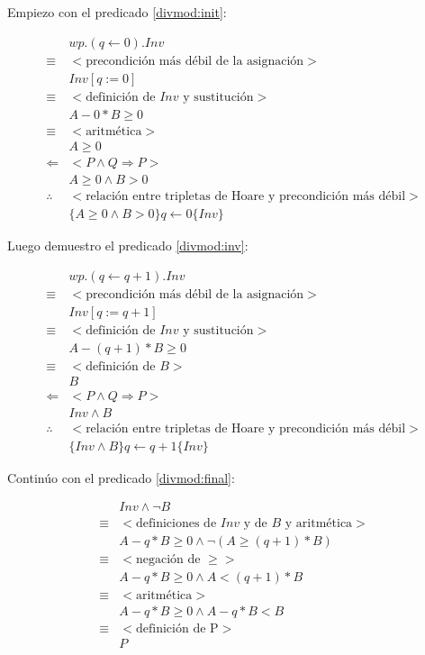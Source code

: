 \documentclass{article}
\begin{document}
Empiezo con el predicado \ref{divmod:init}:

\begin{align*}
 & wp.(q \leftarrow 0).Inv \\
 \equiv & <\text{precondición más débil de la asignación}> \\
 & Inv[q := 0] \\
 \equiv & <\text{definición de } Inv \text{ y sustitución}> \\
 & A - 0*B \geq 0 \\
 \equiv & <\text{aritmética}> \\
 & A \geq 0 \\
 \Leftarrow & <P \wedge Q \Rightarrow P> \\
 & A \geq 0 \wedge B > 0 \\
 \therefore & <\text{relación entre tripletas de Hoare y precondición más débil}> \\
 & \text{\{} A \geq 0 \wedge B > 0 \text{\}} q \leftarrow 0 \text{\{}Inv\text{\}}
\end{align*}

Luego demuestro el predicado \ref{divmod:inv}:

\begin{align*}
 & wp.(q \leftarrow q + 1).Inv \\
 \equiv & <\text{precondición más débil de la asignación}> \\
 & Inv[q := q + 1] \\
 \equiv & <\text{definición de } Inv \text{ y sustitución}> \\
 & A-(q+1)*B \geq 0 \\
 \equiv & <\text{definición de } B> \\
 & B \\
 \Leftarrow & <P \wedge Q \Rightarrow P> \\
 & Inv \wedge B \\
 \therefore & <\text{relación entre tripletas de Hoare y precondición más débil}> \\
 & \text{\{} Inv \wedge B \text{\}} q \leftarrow q + 1 \text{\{}Inv\text{\}}
\end{align*}

Continúo con el predicado \ref{divmod:final}:

\begin{align*}
 & Inv \wedge \neg B \\
 \equiv & <\text{definiciones de } Inv \text{ y de } B \text{ y aritmética}> \\
 & A - q*B \geq 0 \wedge \neg (A \geq (q+1)*B) \\
 \equiv & <\text{negación de } \geq> \\
 & A - q*B \geq 0 \wedge A < (q+1)*B \\
 \equiv & <\text{aritmética}> \\
 & A - q*B \geq 0 \wedge A - q*B < B \\
 \equiv & <\text{definición de P}> \\
 & P
\end{align*}
\end{document}
